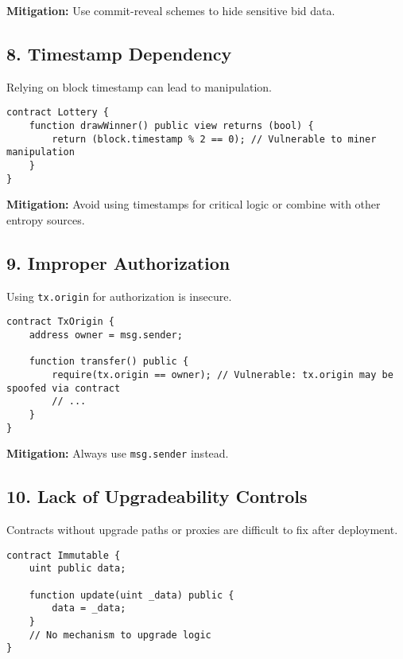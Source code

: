 \textbf{Mitigation:} Use commit-reveal schemes to hide sensitive bid data.

\subsection*{8. Timestamp Dependency}

Relying on block timestamp can lead to manipulation.

\begin{lstlisting}[language=Solidity, caption={Timestamp dependency}, label={lst:timestamp}, captionpos=b]
contract Lottery {
    function drawWinner() public view returns (bool) {
        return (block.timestamp % 2 == 0); // Vulnerable to miner manipulation
    }
}
\end{lstlisting}

\textbf{Mitigation:} Avoid using timestamps for critical logic or combine with other entropy sources.

\subsection*{9. Improper Authorization}

Using \texttt{tx.origin} for authorization is insecure.

\begin{lstlisting}[language=Solidity, caption={Using tx.origin}, label={lst:txorigin}, captionpos=b]
contract TxOrigin {
    address owner = msg.sender;

    function transfer() public {
        require(tx.origin == owner); // Vulnerable: tx.origin may be spoofed via contract
        // ...
    }
}
\end{lstlisting}

\textbf{Mitigation:} Always use \texttt{msg.sender} instead.
\subsection*{10. Lack of Upgradeability Controls}

Contracts without upgrade paths or proxies are difficult to fix after deployment.

\begin{lstlisting}[language=Solidity, caption={Non-upgradable contract}, label={lst:non_upgradeable}, captionpos=b]
contract Immutable {
    uint public data;

    function update(uint _data) public {
        data = _data;
    }
    // No mechanism to upgrade logic
}
\end{lstlisting}

